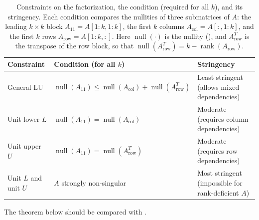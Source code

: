 \documentclass[10pt,twoside]{siamart1116}
\DeclareMathOperator{\rk}{rank}
\DeclareMathOperator{\nl}{null}
\numberwithin{theorem}{section}
\begin{document}
\begin{table}[htbp]
  \centering
  \begin{tabular}{l l p{6.5cm}}
    \toprule
    Constraint & Condition (for all $k$) & Stringency \\
    \midrule
    General LU            & $\nl(A_{11}) \le \nl(A_{\mathrm{col}}) + \nl(A_{\mathrm{row}}^{T})$ & Least stringent (allows mixed dependencies) \\
    Unit lower $L$        & $\nl(A_{11}) = \nl(A_{\mathrm{col}})$                                & Moderate (requires column dependencies) \\
    Unit upper $U$        & $\nl(A_{11}) = \nl(A_{\mathrm{row}}^{T})$                            & Moderate (requires row dependencies) \\
    Unit $L$ and unit $U$ & $A$ strongly non-singular                                            & Most stringent (impossible for rank-deficient $A$) \\
    \bottomrule
  \end{tabular}
  \vspace{5pt}
  \caption{Constraints on the factorization, the condition (required for all $k$), and its stringency. Each condition compares the nullities of three submatrices of $A$: the leading $k \times k$ block $A_{11} = A[1:k,1:k]$, the first $k$ columns $A_{\mathrm{col}} = A[:,1:k]$, and the first $k$ rows $A_{\mathrm{row}} = A[1:k,:]$. Here $\nl(\cdot)$ is the nullity (), and $A_{\mathrm{row}}^{T}$ is the transpose of the row block, so that $\nl(A_{\mathrm{row}}^{T}) = k - \rk(A_{\mathrm{row}})$.}\label{tab:constraints}
\end{table}

The theorem below should be compared with .
\end{document}
